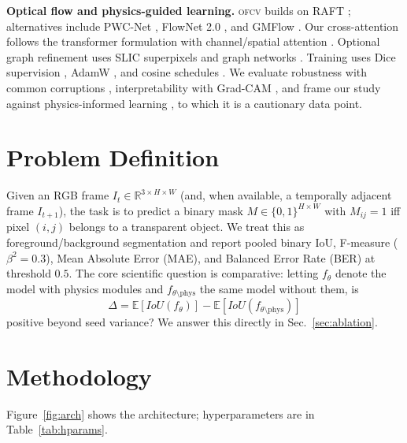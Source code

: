 \documentclass{bmvc2k}
\newcommand{\ofcv}{\textsc{ofcv}}
\newcommand{\iou}{IoU}
\begin{document}
\textbf{Optical flow and physics-guided learning.} \ofcv{} builds on RAFT
\cite{teed2020raft}; alternatives include PWC-Net \cite{sun2018pwcnet}, FlowNet
2.0 \cite{ilg2017flownet2}, and GMFlow \cite{xu2022gmflow}. Our cross-attention
follows the transformer formulation \cite{vaswani2017transformer} with
channel/spatial attention \cite{woo2018cbam,hu2018senet}. Optional graph
refinement uses SLIC superpixels \cite{achanta2012slic} and graph networks
\cite{kipf2017gcn,xu2019gin}. Training uses Dice supervision
\cite{milletari2016vnet}, AdamW \cite{loshchilov2019adamw}, and cosine schedules
\cite{loshchilov2017sgdr}. We evaluate robustness with common corruptions
\cite{hendrycks2019robustness}, interpretability with Grad-CAM
\cite{selvaraju2017gradcam}, and frame our study against physics-informed
learning \cite{karniadakis2021piml}, to which it is a cautionary data point.

\section{Problem Definition}
Given an RGB frame $I_t\in\mathbb{R}^{3\times H\times W}$ (and, when available, a
temporally adjacent frame $I_{t+1}$), the task is to predict a binary mask
$M\in\{0,1\}^{H\times W}$ with $M_{ij}=1$ iff pixel $(i,j)$ belongs to a
transparent object. We treat this as foreground/background segmentation and
report pooled binary \iou, F-measure ($\beta^2=0.3$), Mean Absolute Error
(MAE), and Balanced Error Rate (BER) at threshold $0.5$. The core scientific
question is comparative: letting $f_\theta$ denote the model with physics
modules and $f_{\theta\setminus\mathrm{phys}}$ the same model without them, is
\begin{equation}
\Delta = \mathbb{E}\!\left[\iou(f_\theta)\right]-\mathbb{E}\!\left[\iou(f_{\theta\setminus\mathrm{phys}})\right]
\end{equation}
positive beyond seed variance? We answer this directly in Sec.~\ref{sec:ablation}.

\section{Methodology}
\label{sec:method}
Figure~\ref{fig:arch} shows the architecture; hyperparameters are in
Table~\ref{tab:hparams}.
\end{document}
